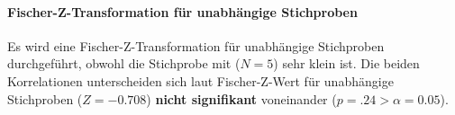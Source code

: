 \documentclass[a4paper,11pt]{article}%
\renewcommand{\\}{\vspace*{0.5\baselineskip} \newline}
\begin{document}
\paragraph{Fischer-Z-Transformation für unabhängige Stichproben}
Es wird eine Fischer-Z-Transformation für unabhängige Stichproben durchgeführt, obwohl die Stichprobe mit ($N=5$) sehr klein ist.
Die beiden Korrelationen unterscheiden sich laut Fischer-Z-Wert für unabhängige Stichproben ($Z=-0.708$) \textbf{nicht signifikant} voneinander ($p = .24 > \alpha = 0.05$).
%
%
%
\end{document}
